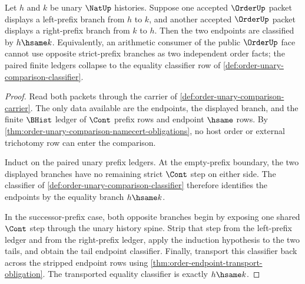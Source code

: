 \begin{theorem}\label{thm:order-prefix-branch-antisymmetry}
Let $h$ and $k$ be unary $\NatUp$ histories. Suppose one accepted $\OrderUp$ packet displays a left-prefix branch from $h$ to $k$, and another accepted $\OrderUp$ packet displays a right-prefix branch from $k$ to $h$. Then the two endpoints are classified by $h\hsame k$. Equivalently, an arithmetic consumer of the public $\OrderUp$ face cannot use opposite strict-prefix branches as two independent order facts; the paired finite ledgers collapse to the equality classifier row of \autoref{def:order-unary-comparison-classifier}.
\end{theorem}
\begin{proof}
Read both packets through the carrier of \autoref{def:order-unary-comparison-carrier}. The only data available are the endpoints, the displayed branch, and the finite $\BHist$ ledger of $\Cont$ prefix rows and endpoint $\hsame$ rows. By \autoref{thm:order-unary-comparison-namecert-obligations}, no host order or external trichotomy row can enter the comparison.

Induct on the paired unary prefix ledgers. At the empty-prefix boundary, the two displayed branches have no remaining strict $\Cont$ step on either side. The classifier of \autoref{def:order-unary-comparison-classifier} therefore identifies the endpoints by the equality branch $h\hsame k$.

In the successor-prefix case, both opposite branches begin by exposing one shared $\Cont$ step through the unary history spine. Strip that step from the left-prefix ledger and from the right-prefix ledger, apply the induction hypothesis to the two tails, and obtain the tail endpoint classifier. Finally, transport this classifier back across the stripped endpoint rows using \autoref{thm:order-endpoint-transport-obligation}. The transported equality classifier is exactly $h\hsame k$.
\end{proof}

